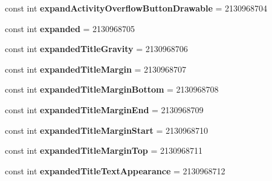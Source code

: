 \begin{DoxyCompactItemize}
\mbox{\label{classst_delivery_1_1_resource_1_1_attribute_a3e88b5bb0e799740aa7815aaa3772602}} 
const int {\bfseries expand\+Activity\+Overflow\+Button\+Drawable} = 2130968704
\item 
\mbox{\label{classst_delivery_1_1_resource_1_1_attribute_a9f560fac814ca267a8aa6a7e547759c9}} 
const int {\bfseries expanded} = 2130968705
\item 
\mbox{\label{classst_delivery_1_1_resource_1_1_attribute_a014cf78bc4841208ca036b70ad89d1fb}} 
const int {\bfseries expanded\+Title\+Gravity} = 2130968706
\item 
\mbox{\label{classst_delivery_1_1_resource_1_1_attribute_a7ef177c1a679093728083054ea11c066}} 
const int {\bfseries expanded\+Title\+Margin} = 2130968707
\item 
\mbox{\label{classst_delivery_1_1_resource_1_1_attribute_acb6241ac2c3d6809f2d8afd4ff42172f}} 
const int {\bfseries expanded\+Title\+Margin\+Bottom} = 2130968708
\item 
\mbox{\label{classst_delivery_1_1_resource_1_1_attribute_aa040afa266b4accdea8d0cfadc7b6f67}} 
const int {\bfseries expanded\+Title\+Margin\+End} = 2130968709
\item 
\mbox{\label{classst_delivery_1_1_resource_1_1_attribute_a9c668f6b2e412e44aef17c054632784a}} 
const int {\bfseries expanded\+Title\+Margin\+Start} = 2130968710
\item 
\mbox{\label{classst_delivery_1_1_resource_1_1_attribute_abc53ba01a087d090577a44e91673cdb2}} 
const int {\bfseries expanded\+Title\+Margin\+Top} = 2130968711
\item 
\mbox{\label{classst_delivery_1_1_resource_1_1_attribute_ae46ce29feb5ceae1d905650d9c940785}} 
const int {\bfseries expanded\+Title\+Text\+Appearance} = 2130968712

\end{DoxyCompactItemize}
